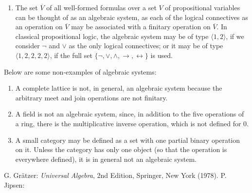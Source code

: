 \documentclass[12pt]{article}
\begin{document}
\begin{enumerate}
\item The set $\overline{V}$ of all well-formed formulas over a set $V$ of propositional variables can be thought of as an algebraic system, as each of the logical connectives as an operation on $\overline{V}$ may be associated with a finitary operation on $\overline{V}$.  In classical propositional logic, the algebraic system may be of type $\langle 1,2\rangle$, if we consider $\neg$ and $\vee$ as the only logical connectives; or it may be of type $\langle 1,2,2,2,2\rangle$, if the full set $\lbrace \neg, \vee, \wedge, \to, \leftrightarrow \rbrace$ is used.
\end{enumerate}

Below are some non-examples of algebraic systems:

\begin{enumerate}
\item A complete lattice is not, in general, an algebraic system because the arbitrary meet and join operations are not finitary.
\item A field is not an algebraic system, since, in addition to the five operations of a ring, there is the multiplicative inverse operation, which is not defined for $0$.
\item A small category may be defined as a set with one partial binary operation on it.  Unless the category has only one object (so that the operation is everywhere defined), it is in general not an algebraic system.
\end{enumerate}

\begin{thebibliography}{7}
 G. Gr\"{a}tzer: {\em Universal Algebra}, 2nd Edition, Springer, New York (1978).
 P. Jipsen: {\em {}}
\end{thebibliography}
\end{document}
